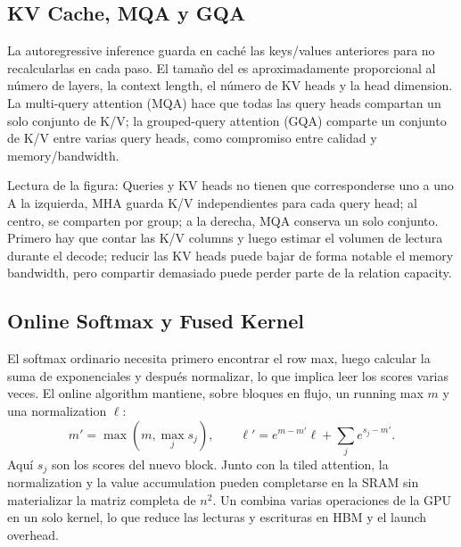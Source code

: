 \subsection{KV Cache, MQA y GQA}

La autoregressive inference guarda en caché las keys/values anteriores para no recalcularlas en cada paso. El tamaño del  es aproximadamente proporcional al número de layers, la context length, el número de KV heads y la head dimension. La multi-query attention (MQA) hace que todas las query heads compartan un solo conjunto de K/V; la grouped-query attention (GQA) comparte un conjunto de K/V entre varias query heads, como compromiso entre calidad y memory/bandwidth.


\begin{knowledgebox}{Lectura de la figura: Queries y KV heads no tienen que corresponderse uno a uno}
A la izquierda, MHA guarda K/V independientes para cada query head; al centro, se comparten por group; a la derecha, MQA conserva un solo conjunto. Primero hay que contar las K/V columns y luego estimar el volumen de lectura durante el decode; reducir las KV heads puede bajar de forma notable el memory bandwidth, pero compartir demasiado puede perder parte de la relation capacity.
\end{knowledgebox}

\subsection{Online Softmax y Fused Kernel}

El softmax ordinario necesita primero encontrar el row max, luego calcular la suma de exponenciales y después normalizar, lo que implica leer los scores varias veces. El online algorithm mantiene, sobre bloques en flujo, un running max $m$ y una normalization $\ell$:
\[
m' = \max(m,\max_j s_j),\qquad
\ell'=e^{m-m'}\ell+\sum_j e^{s_j-m'}.
\]
Aquí $s_j$ son los scores del nuevo block. Junto con la tiled attention, la normalization y la value accumulation pueden completarse en la SRAM sin materializar la matriz completa de $n^2$. Un  combina varias operaciones de la GPU en un solo kernel, lo que reduce las lecturas y escrituras en HBM y el launch overhead.


